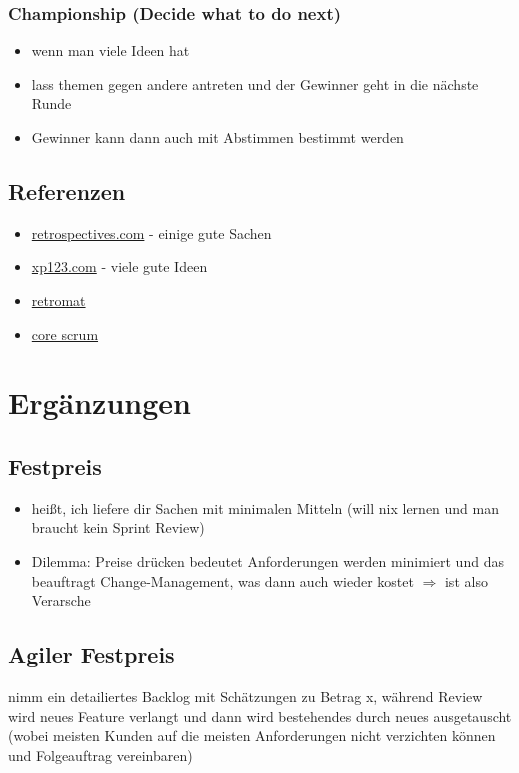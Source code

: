 \subsubsection{Championship (Decide what to do next)}

\begin{itemize}
  \item wenn man viele Ideen hat
  \item lass themen gegen andere antreten und der Gewinner geht in die nächste Runde
  \item Gewinner kann dann auch mit Abstimmen bestimmt werden
\end{itemize}


\subsection{Referenzen}
\begin{itemize}
  \item \href{http://retrospectives.com/}{retrospectives.com} - einige gute Sachen
  \item
    \href{http://xp123.com/articles/patterns-for-iteration-retrospectives/}{xp123.com} - viele
    gute Ideen
  \item \href{http://plans-for-retrospectives.com}{retromat}
  \item \href{https://www.scrumalliance.org/why-scrum/core-scrum-values-roles}{core scrum}
\end{itemize}
\pagebreak


\section{Ergänzungen}
\subsection{Festpreis}
\begin{itemize}
  \item heißt, ich liefere dir Sachen mit minimalen Mitteln (will nix lernen und man braucht kein Sprint Review)
  \item Dilemma: Preise drücken bedeutet Anforderungen werden minimiert und das beauftragt
    Change-Management, was dann auch wieder kostet $\Rightarrow$ ist also Verarsche
\end{itemize}


\subsection{Agiler Festpreis}
nimm ein detailiertes Backlog mit Schätzungen zu Betrag x, während Review wird neues Feature
verlangt und dann wird bestehendes durch neues ausgetauscht (wobei meisten Kunden auf die
meisten Anforderungen nicht verzichten können und Folgeauftrag vereinbaren)


